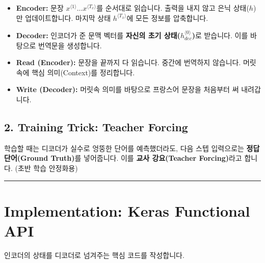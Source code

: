 \documentclass[11pt,a4paper]{book}
\theoremstyle{definition}
\begin{document}
\begin{itemize}
    \item \textbf{Encoder:} 문장 $x^{\langle 1 \rangle} \dots x^{\langle T_x \rangle}$를 순서대로 읽습니다. 출력을 내지 않고 은닉 상태($h$)만 업데이트합니다. 마지막 상태 $h^{\langle T_x \rangle}$에 모든 정보를 압축합니다.
    \item \textbf{Decoder:} 인코더가 준 문맥 벡터를 \textbf{자신의 초기 상태($h^{\langle 0 \rangle}_{dec}$)}로 받습니다. 이를 바탕으로 번역문을 생성합니다.
\end{itemize}

\begin{analogybox}[title={번역가의 작업 방식}]
\begin{itemize}
    \item \textbf{Read (Encoder):} 문장을 끝까지 다 읽습니다. 중간에 번역하지 않습니다. 머릿속에 핵심 의미(Context)를 정리합니다.
    \item \textbf{Write (Decoder):} 머릿속 의미를 바탕으로 프랑스어 문장을 처음부터 써 내려갑니다.
\end{itemize}
\end{analogybox}

\subsection{2. Training Trick: Teacher Forcing}
학습할 때는 디코더가 실수로 엉뚱한 단어를 예측했더라도, 다음 스텝 입력으로는 \textbf{정답 단어(Ground Truth)}를 넣어줍니다. 이를 \textbf{교사 강요(Teacher Forcing)}라고 합니다. (초반 학습 안정화용)

\vspace{0.5cm}\hrule\vspace{0.5cm}

\section{Implementation: Keras Functional API}

인코더의 상태를 디코더로 넘겨주는 핵심 코드를 작성합니다.
\end{document}

